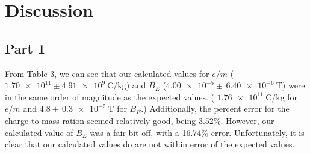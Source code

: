 \documentclass[letterpaper]{article}
\begin{document}
%
%
%
%



\section{Discussion}

\subsection{Part 1}


From Table 3, we can see that our calculated values for $e/m$
($\num{1.70e11} \pm \SI{4.91e9}{\coulomb\per\kilogram}$)
and $B_E$
($\num{4.00e-5} \pm \,\SI{6.40e-6}{\tesla}$) were in the same order of magnitude as the
expected values. ( $\SI{1.76e11}{\coulomb\per\kilogram}$ for $e/m$
and $4.8 \pm \,\SI{0.3e-5}{\tesla}$ for $B_E$.)
Additionally, the percent error for the charge to mass ration seemed relatively good, being 3.52\%.
However, our calculated value of $B_E$ was a fair bit off, with a 16.74\% error.
Unfortunately, it is clear that our calculated values do are not within error of the
expected values.
\end{document}

